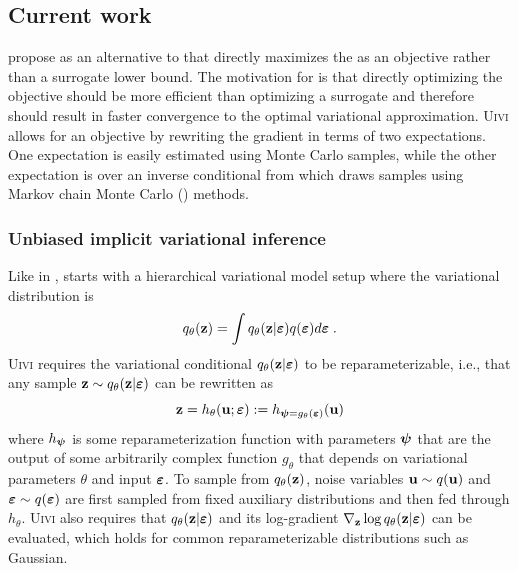 \documentclass[10pt]{article}
\begin{document}
\subsection{Current work} \label{an:uivi}

\citet{Titsias:2019} propose \uivi as an alternative to \sivi that directly maximizes the \elbo as an objective rather than a surrogate lower bound. The motivation for \uivi is that directly optimizing the \elbo objective should be more efficient than optimizing a surrogate and therefore should result in faster convergence to the optimal variational approximation. \textsc{Uivi} allows for an \elbo objective by rewriting the \elbo gradient in terms of two expectations. One expectation is easily estimated using Monte Carlo samples, while the other expectation is over an inverse conditional from which \uivi draws samples using Markov chain Monte Carlo (\mcmc) methods.

\subsubsection{Unbiased implicit variational inference}

Like in \sivi, \uivi starts with a hierarchical variational model setup where the variational distribution is
\[
q_\theta(\mathbf{z}) = \int q_\theta(\mathbf{z}|\bm{\varepsilon})q(\bm{\varepsilon})d\bm{\varepsilon} \;.
\]
\textsc{Uivi} requires the variational conditional $q_\theta(\mathbf{z}|\bm{\varepsilon})$ to be reparameterizable, i.e., that any sample $\mathbf{z}\sim q_\theta(\mathbf{z}|\bm{\varepsilon})$ can be rewritten as
\[
\mathbf{z} = h_\theta(\mathbf{u};\bm{\varepsilon}) := h_{\bm{\psi}=g_\theta(\bm{\varepsilon})}(\mathbf{u}) 
\]
where $h_{\bm{\psi}}$ is some reparameterization function with parameters $\bm{\psi}$ that are the output of some arbitrarily complex function $g_\theta$ that depends on variational parameters $\theta$ and input $\bm{\varepsilon}$. To sample from $q_\theta(\mathbf{z})$, noise variables $\mathbf{u}\sim q(\mathbf{u})$ and $\bm{\varepsilon}\sim q(\bm{\varepsilon})$ are first sampled from fixed auxiliary distributions and then fed through $h_\theta$. \textsc{Uivi} also requires that $q_\theta(\mathbf{z}|\bm{\varepsilon})$ and its log-gradient $\nabla_{\mathbf{z}}\log q_\theta(\mathbf{z}|\bm{\varepsilon})$ can be evaluated, which holds for common reparameterizable distributions such as Gaussian.
\\
\end{document}

